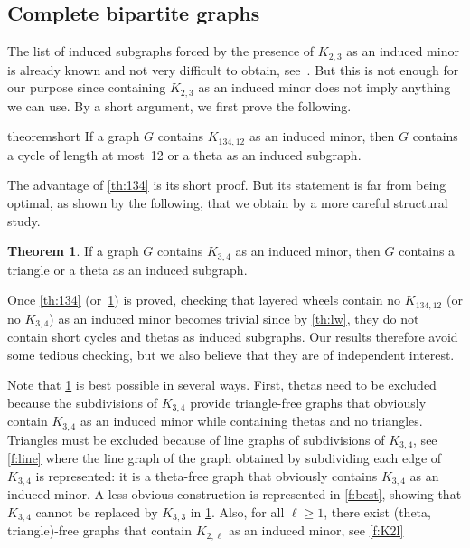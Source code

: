 \documentclass[11pt]{article}
\theoremstyle{definition}
\newtheorem{theorem}{Theorem}[section]
\theoremstyle{definition}
\begin{document}
\subsection*{Complete bipartite graphs}

The list of induced subgraphs forced by the presence of $K_{2, 3}$ as an induced minor is already known and not very difficult to obtain, see~\cite{DBLP:conf/iwoca/DallardDHMPT24}. But this is not enough for our purpose since containing $K_{2, 3}$ as an induced minor does not imply anything we can use. By a short argument, we first prove the following.

\begin{restatable}{theorem}{short}
  \label{th:134}
  If a graph $G$ contains $K_{134, 12}$ as an induced minor, then $G$
  contains a cycle of length at most~12 or a theta as an induced
  subgraph. 
\end{restatable}

The advantage of \cref{th:134} is its short proof. But its statement
is far from being optimal, as shown by the following, that we obtain
by a more careful structural study.

\begin{theorem}
  \label{th:k34ThetaTriangle}
  If a graph $G$ contains $K_{3, 4}$ as an induced minor, then $G$
  contains a triangle or a theta as an induced subgraph. 
\end{theorem}

Once \cref{th:134} (or~\ref{th:k34ThetaTriangle}) is proved, checking
that layered wheels contain no $K_{134, 12}$ (or no $K_{3, 4}$) as an
induced minor becomes trivial since by \cref{th:lw}, they
do not contain short cycles and thetas as induced subgraphs.  Our results therefore avoid some tedious checking, but we also believe
that they are of independent interest.

Note that \cref{th:k34ThetaTriangle} is best possible in several ways.
First, thetas need to be excluded because the subdivisions of
$K_{3, 4}$ provide triangle-free graphs that obviously contain
$K_{3, 4}$ as an induced minor while containing thetas and no
triangles.  Triangles must be excluded because of line graphs of
subdivisions of $K_{3, 4}$, see \cref{f:line} where the line graph of
the graph obtained by subdividing each edge of $K_{3, 4}$ is
represented: it is a theta-free graph that obviously contains
$K_{3, 4}$ as an induced minor.  A less obvious construction is
represented in \cref{f:best}, showing that $K_{3, 4}$ cannot be
replaced by $K_{3, 3}$ in \cref{th:k34ThetaTriangle}.  Also, for all
$\ell \geq 1$, there exist (theta, triangle)-free graphs that contain
$K_{2, \ell}$ as an induced minor, see \cref{f:K2l}
\end{document}
